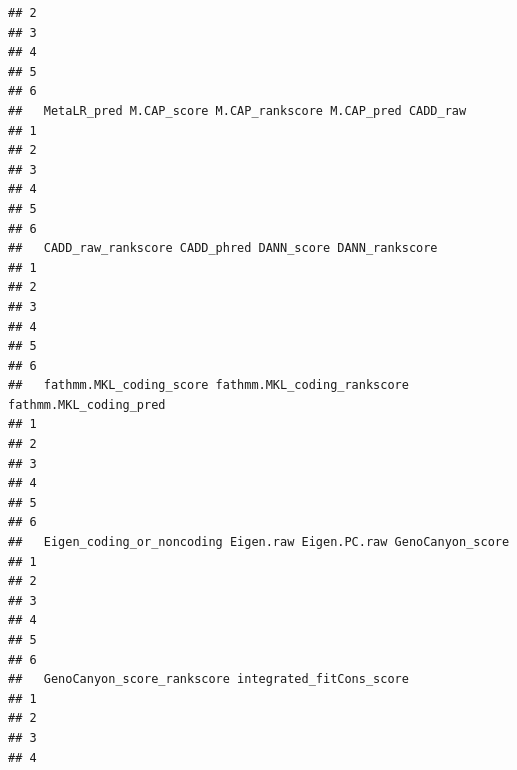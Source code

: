 \documentclass[
]{article}
\begin{document}
\begin{verbatim}
## 2                                                                           
## 3                                                                           
## 4                                                                           
## 5                                                                           
## 6                                                                           
##   MetaLR_pred M.CAP_score M.CAP_rankscore M.CAP_pred CADD_raw
## 1                                                            
## 2                                                            
## 3                                                            
## 4                                                            
## 5                                                            
## 6                                                            
##   CADD_raw_rankscore CADD_phred DANN_score DANN_rankscore
## 1                                                        
## 2                                                        
## 3                                                        
## 4                                                        
## 5                                                        
## 6                                                        
##   fathmm.MKL_coding_score fathmm.MKL_coding_rankscore fathmm.MKL_coding_pred
## 1                                                                           
## 2                                                                           
## 3                                                                           
## 4                                                                           
## 5                                                                           
## 6                                                                           
##   Eigen_coding_or_noncoding Eigen.raw Eigen.PC.raw GenoCanyon_score
## 1                                                                  
## 2                                                                  
## 3                                                                  
## 4                                                                  
## 5                                                                  
## 6                                                                  
##   GenoCanyon_score_rankscore integrated_fitCons_score
## 1                                                    
## 2                                                    
## 3                                                    
## 4                                                    

\end{verbatim}
\end{document}
